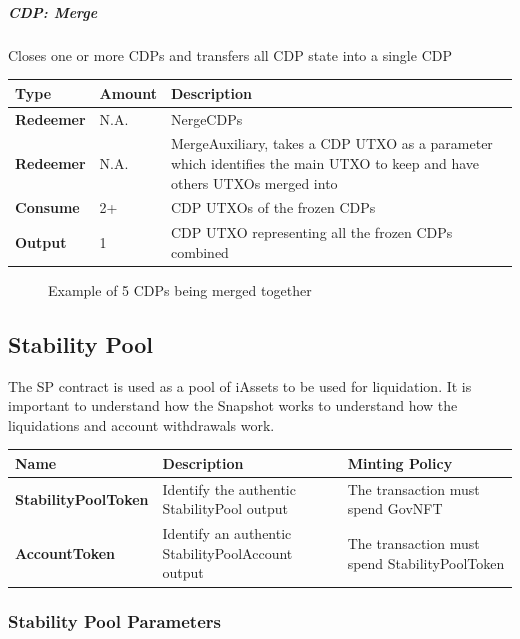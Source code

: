 \documentclass{article}
\begin{document}
\begin{sloppypar}
\hypertarget{cdp-merge}{%
\subparagraph{CDP: Merge}\label{cdp-merge}}

Closes one or more CDPs and transfers all CDP state into a single CDP

\begin{tabularx}{\linewidth}{l|l|L}
\toprule
\textbf{Type} & \textbf{Amount} & \textbf{Description}
\tabularnewline
\midrule
\endhead
\textbf{Redeemer} & N.A. & NergeCDPs
\tabularnewline
\midrule
\textbf{Redeemer} & N.A. & MergeAuxiliary, takes a CDP UTXO as a
parameter which identifies the main UTXO to keep and have others UTXOs
merged into
\tabularnewline
\midrule
\textbf{Consume} & 2+ & CDP UTXOs of the frozen CDPs
\tabularnewline
\midrule
\textbf{Output} & 1 & CDP UTXO representing all the frozen CDPs
combined
\tabularnewline
\bottomrule
\end{tabularx}

\hypertarget{cdp-merge-utxo-figure}{%
\begin{figure}[htbp]
\centering

\caption{Example of 5 CDPs being merged together}
\label{cdp-merge-utxo-figure}
\end{figure}}

\hypertarget{stability-pool}{%
\subsection{Stability Pool}\label{stability-pool}}

The SP contract is used as a pool of iAssets to be used for liquidation.
It is important to understand how the Snapshot works to understand how
the liquidations and account withdrawals work.

\begin{tabularx}{\linewidth}{l|L|L}
\caption{Stability Pool native tokens}
\tabularnewline
\toprule
\textbf{Name} & \textbf{Description} & \textbf{Minting
Policy}
\tabularnewline
\midrule
\endhead
\textbf{StabilityPoolToken} & Identify the authentic StabilityPool
output & The transaction must spend GovNFT
\tabularnewline
\midrule
\textbf{AccountToken} & Identify an authentic StabilityPoolAccount
output & The transaction must spend StabilityPoolToken
\tabularnewline
\bottomrule
\end{tabularx}

\hypertarget{stability-pool-parameters}{%
\subsubsection{Stability Pool
Parameters}\label{stability-pool-parameters}}


\end{sloppypar}
\end{document}
